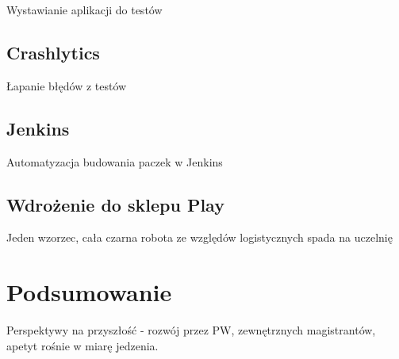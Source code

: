 \documentclass{pracamgr}
\begin{document}
Wystawianie aplikacji do testów

\section{Crashlytics}

Łapanie błędów z testów

\section{Jenkins}

Automatyzacja budowania paczek w Jenkins

\section{Wdrożenie do sklepu Play}

Jeden wzorzec, cała czarna robota ze względów logistycznych spada na uczelnię

\chapter{Podsumowanie}

Perspektywy na przyszłość - rozwój przez PW, zewnętrznych magistrantów, apetyt rośnie w miarę jedzenia.

\appendix

\newpage
\listoffigures

\end{document}
